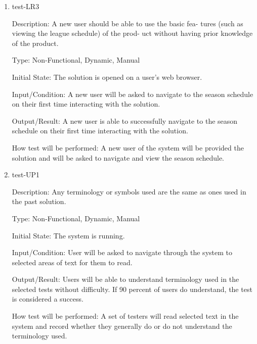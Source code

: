 \documentclass[12pt, titlepage]{article}
\begin{document}
\begin{enumerate}
  \item{test-LR3\\}
  
  Description: A new user should be able to use the basic fea-
  tures (such as viewing the league schedule) of the prod-
  uct without having prior knowledge of the product.

  Type: Non-Functional, Dynamic, Manual

  Initial State: The solution is opened on a user's web browser.

  Input/Condition: A new user will be asked to navigate to the season schedule on their first
  time interacting with the solution.

  Output/Result: A new user is able to successfully navigate to the season schedule on
  their first time interacting with the solution.

  How test will be performed: A new user of the system will be provided the solution and
  will be asked to navigate and view the season schedule.

  \item{test-UP1\\}
  
  Description: Any terminology or symbols used are the same as
  ones used in the past solution.

  Type: Non-Functional, Dynamic, Manual

  Initial State: The system is running.

  Input/Condition: User will be asked to navigate through the system to 
  selected areas of text for them to read.

  Output/Result: Users will be able to understand terminology used in
  the selected tests without difficulty. If 90 percent of users do understand,
  the test is considered a success.

  How test will be performed: A set of testers will read selected text
  in the system and record whether they generally do or do not 
  understand the terminology used. 







\end{enumerate}
\end{document}

